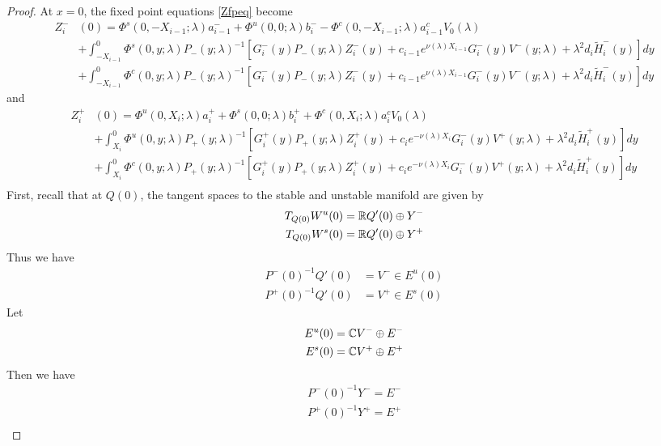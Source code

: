 \documentclass[thesis.tex]{subfiles}
\begin{document}
\begin{lemma}
\begin{proof}
At $x = 0$, the fixed point equations \eqref{Zfpeq} become
\begin{align*}
Z_i^-&(0) = \Phi^s(0, -X_{i-1}; \lambda) a_{i-1}^- + \Phi^u(0, 0; \lambda) b_i^- -\Phi^c(0, -X_{i-1}; \lambda) a_{i-1}^c V_0(\lambda) \\
&+ \int_{-X_{i-1}}^0 \Phi^s(0, y; \lambda)P_-(y; \lambda)^{-1} [ G_i^-(y) P_-(y; \lambda) Z_i^-(y) + c_{i-1} e^{\nu(\lambda)X_{i-1}} G_i^-(y) V^-(y; \lambda) + \lambda^2 d_i \tilde{H}_i^-(y)] dy \\
&+ \int_{-X_{i-1}}^0 \Phi^c(0, y; \lambda) P_-(y; \lambda)^{-1} [ G_i^-(y) P_-(y; \lambda) Z_i^-(y) + c_{i-1} e^{\nu(\lambda)X_{i-1}} G_i^-(y) V^-(y; \lambda) + \lambda^2 d_i \tilde{H}_i^-(y)] dy
\end{align*}
and
\begin{align*}
Z_i^+&(0) = \Phi^u(0, X_i; \lambda) a_i^+ + \Phi^s(0, 0; \lambda) b_i^+ + \Phi^c(0, X_i; \lambda) a_i^c V_0(\lambda) \\
&+ \int_{X_i}^0 \Phi^u(0, y; \lambda) P_+(y; \lambda)^{-1} [ G_i^+(y) P_+(y; \lambda) Z_i^+(y) + c_i e^{-\nu(\lambda)X_i} G_i^-(y) V^+(y; \lambda) + \lambda^2 d_i \tilde{H}_i^+(y)] dy \\
&+ \int_{X_i}^0 \Phi^c(0, y; \lambda) P_+(y; \lambda)^{-1} [ G_i^+(y) P_+(y; \lambda) Z_i^+(y) + c_i e^{-\nu(\lambda)X_i} G_i^-(y) V^+(y; \lambda) + \lambda^2 d_i \tilde{H}_i^+(y)] dy \\
\end{align*}
First, recall that at $Q(0)$, the tangent spaces to the stable and unstable manifold are given by
\begin{align*}
T_{Q(0)} W^u(0) &= \mathbb{R} Q'(0) \oplus Y^- \\
T_{Q(0)} W^s(0) &= \mathbb{R} Q'(0) \oplus Y^+
\end{align*}
Thus we have
\begin{align*}
P^-(0)^{-1} Q'(0) &= V^- \in E^u(0) \\
P^+(0)^{-1} Q'(0) &= V^+ \in E^s(0)
\end{align*}
Let
\begin{align*}
E^u(0) &= \mathbb{C} V^- \oplus E^- \\
E^s(0) &= \mathbb{C} V^+ \oplus E^+ \\
\end{align*}
Then we have
\begin{align*}
P^-(0)^{-1} Y^- = E^- \\
P^+(0)^{-1} Y^+ = E^+ \\
\end{align*}

\end{proof}
\end{lemma}
\end{document}
